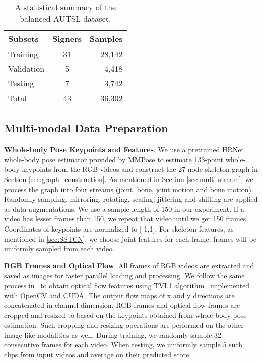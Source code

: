 \documentclass[final]{cvpr}
\begin{document}
\begin{table}
\begin{center}
\begin{tabular}{l c r}
\hline
Subsets & Signers & Samples \\
\hline
Training & 31 & 28,142\\
Validation & 5 & 4,418\\
Testing & 7 & 3,742\\
Total & 43 & 36,302\\
\hline
\end{tabular}
\end{center}\caption{A statistical summary of the balanced AUTSL dataset.}\label{dataset_table}
\end{table}





\subsection{Multi-modal Data Preparation}

\noindent\textbf{Whole-body Pose Keypoints and Features}. 
We use a pretrained HRNet \cite{sun2019deep} whole-body pose estimator provided by MMPose \cite{mmpose2020} to estimate 133-point whole-body keypoints from the RGB videos and construct the 27-node skeleton graph in Section \ref{sec:graph_construction}. As mentioned in Section \ref{sec:multi-stream}, we process the graph into four streams (joint, bone, joint motion and bone motion). 
Randomly sampling, mirroring, rotating, scaling, jittering and shifting are applied as data augmentations. We use a sample length of 150 in our experiment. If a video has lesser frames than 150, we repeat that video until we get 150 frames. Coordinates of keypoints are normalized to [-1,1]. For skeleton features, as mentioned in \ref{sec:SSTCN}, we choose  joint features for each frame.  frames will be uniformly sampled from each video.

\noindent\textbf{RGB Frames and Optical Flow}. 
All frames of RGB videos are extracted and saved as images for faster parallel loading and processing. 
We follow the same process in~\cite{wang2016temporal} to obtain optical flow features using TVL1 algorithm~\cite{zach2007duality} implemented with OpenCV and CUDA. The output flow maps of x and y directions are concatenated in channel dimension. RGB frames and optical flow frames are cropped and resized to  based on the keypoints obtained from whole-body pose estimation. Such cropping and resizing operations are performed on the other image-like modalities as well. During training, we randomly sample 32 consecutive frames for each video. When testing, we uniformly sample 5 such clips from input videos and average on their predicted score. 
\end{document}
